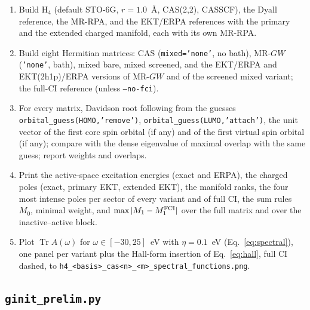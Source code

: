 \documentclass[11pt,a4paper]{article}
\newcommand{\code}[1]{\texttt{#1}}
\begin{document}
\begin{enumerate}[leftmargin=2em]
\item Build H$_4$ (default STO-6G, $r=1.0$~\AA, CAS(2,2), CASSCF), the Dyall
  reference, the MR-RPA, and the EKT/ERPA references with the primary and the
  extended charged manifold, each with its own MR-RPA.
\item Build eight Hermitian matrices: CAS (\code{mixed='none'}, no bath),
  MR-$GW$ (\code{'none'}, bath), mixed bare, mixed screened, and the
  EKT/ERPA and EKT(2h1p)/ERPA versions of MR-$GW$ and of the screened mixed
  variant; the full-CI reference (unless \code{--no-fci}).
\item For every matrix, Davidson root following from the guesses
  \code{orbital\_guess(HOMO,'remove')}, \code{orbital\_guess(LUMO,'attach')},
  the unit vector of the first core spin orbital (if any) and of the first
  virtual spin orbital (if any); compare with the dense eigenvalue of
  maximal overlap with the same guess; report weights and overlaps.
\item Print the active-space excitation energies (exact and ERPA), the
  charged poles (exact, primary EKT, extended EKT), the manifold ranks, the
  four most intense poles per sector of every variant and of full CI, the
  sum rules $M_0$, minimal weight, and $\max|M_1-M_1^{\rm FCI}|$ over the
  full matrix and over the inactive--active block.
\item Plot $\operatorname{Tr}A(\omega)$ for $\omega\in[-30,25]$~eV with
  $\eta=0.1$~eV (Eq.~\eqref{eq:spectral}), one panel per variant plus the
  Hall-form insertion of Eq.~\eqref{eq:hall}, full CI dashed, to
  \code{h4\_<basis>\_cas<n>\_<m>\_spectral\_functions.png}.
\end{enumerate}

\subsection{\code{ginit\_prelim.py}}
\end{document}

